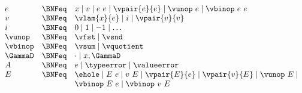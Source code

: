 \begin{flushleft}

\\
$\begin{array}{l c l}
  e & \BNFeq & x \mid v \mid e~e \mid \vpair{e}{e} \mid \vunop~e \mid \vbinop~e~e
\\
  v & \BNFeq & \vlam{x}{e} \mid i \mid \vpair{v}{v}
\\
  i & \BNFeq & 0 \mid 1 \mid -1 \mid \ldots
\\
  \vunop & \BNFeq & \vfst \mid \vsnd
\\
  \vbinop & \BNFeq & \vsum \mid \vquotient
\\
  \GammaD & \BNFeq & \cdot \mid x,\GammaD
\\
  A & \BNFeq & e \mid \typeerror \mid \valueerror
\\
  E & \BNFeq & \ehole \mid E~e \mid v~E \mid
                  \vpair{E}{e} \mid \vpair{v}{E} \mid \vunop~E \mid
\\ & &            \vbinop~E~e \mid \vbinop~v~E
\end{array}$

\medskip
{}\\
\begin{mathpar}







\end{mathpar}


\end{flushleft}
